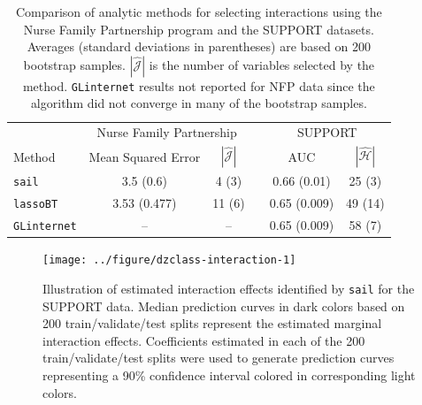 \documentclass[useAMS,usenatbib,referee]{biom}
\begin{document}
%
%
%





\begin{table}
	\centering
	\caption{Comparison of analytic methods for selecting interactions using the Nurse Family Partnership program and the SUPPORT datasets. Averages (standard deviations in parentheses) are based on 200 bootstrap samples. $|\widehat{\mathcal{J}}|$ is the number of variables selected by the method. \texttt{GLinternet} results not reported for NFP data since the algorithm did not converge in many of the bootstrap samples.}
	\label{tab:rda}
	\begin{tabular}{lccccc}
		\hline
	& \multicolumn{2}{c}{Nurse Family Partnership} &  &\multicolumn{2}{c}{SUPPORT} \\
\cmidrule(r){2-3} \cmidrule(l){5-6}	            
Method          &  Mean Squared Error                                                                 & $|\widehat{\mathcal{J}}|$                                                       & & AUC                                                                            & $|\widehat{\mathcal{H}}|$ \\
\hline
\texttt{sail}  &  3.5 (0.6)     &  4 (3) & & 0.66 (0.01)     &  25 (3)  \\
\texttt{lassoBT}    &  3.53 (0.477)     &  11 (6)   & &  0.65 (0.009)     &  49 (14)  \\
\texttt{GLinternet} &  	--                                                                               & --                                                                               & &  0.65 (0.009)     &  58 (7)   \\
		\hline
	\end{tabular}
\end{table}




%
%
%


\begin{figure}
	
	{\centering \texttt{[image: ../figure/dzclass-interaction-1]} 
		
	}
	
	\caption[Illustration of estimated interaction effects identified by \texttt{sail} for the SUPPORT data]{Illustration of estimated interaction effects identified by \texttt{sail} for the SUPPORT data. Median prediction curves in dark colors based on 200 train/validate/test splits represent the estimated marginal interaction effects. Coefficients estimated in each of the 200 train/validate/test splits were used to generate prediction curves representing a 90\% confidence interval colored in corresponding light colors.}\label{fig:dzclass-interaction}
\end{figure}
\end{document}
